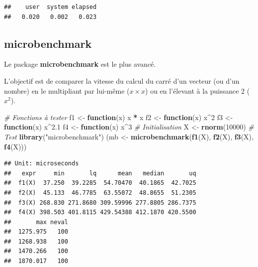 \documentclass[
  12pt,
  french,
  a4paper,
  extrafontsizes,onecolumn,openright
  ]{memoir}
\newenvironment{Shaded}{\begin{snugshade}}{\end{snugshade}}
\newcommand{\CommentTok}[1]{\textcolor[rgb]{0.56,0.35,0.01}{\textit{#1}}}
\newcommand{\ControlFlowTok}[1]{\textcolor[rgb]{0.13,0.29,0.53}{\textbf{#1}}}
\newcommand{\DecValTok}[1]{\textcolor[rgb]{0.00,0.00,0.81}{#1}}
\newcommand{\FloatTok}[1]{\textcolor[rgb]{0.00,0.00,0.81}{#1}}
\newcommand{\KeywordTok}[1]{\textcolor[rgb]{0.13,0.29,0.53}{\textbf{#1}}}
\newcommand{\NormalTok}[1]{#1}
\newcommand{\OperatorTok}[1]{\textcolor[rgb]{0.81,0.36,0.00}{\textbf{#1}}}
\newcommand{\StringTok}[1]{\textcolor[rgb]{0.31,0.60,0.02}{#1}}
\begin{document}
\begin{verbatim}
##    user  system elapsed 
##   0.020   0.002   0.023
\end{verbatim}

\normalsize

\hypertarget{microbenchmark}{%
\subsection{microbenchmark}\label{microbenchmark}}

Le package \textbf{microbenchmark} est le plus avancé.

L'objectif est de comparer la vitesse du calcul du carré d'un vecteur (ou d'un nombre) en le multipliant par lui-même (\(x \times x\)) ou en l'élevant à la puissance 2 (\(x^2\)).

\scriptsize

\begin{Shaded}
\begin{Highlighting}[]
\CommentTok{# Fonctions à tester}
\NormalTok{f1 <-}\StringTok{ }\ControlFlowTok{function}\NormalTok{(x) x }\OperatorTok{*}\StringTok{ }\NormalTok{x}
\NormalTok{f2 <-}\StringTok{ }\ControlFlowTok{function}\NormalTok{(x) x}\OperatorTok{^}\DecValTok{2}
\NormalTok{f3 <-}\StringTok{ }\ControlFlowTok{function}\NormalTok{(x) x}\OperatorTok{^}\FloatTok{2.1}
\NormalTok{f4 <-}\StringTok{ }\ControlFlowTok{function}\NormalTok{(x) x}\OperatorTok{^}\DecValTok{3}
\CommentTok{# Initialisation}
\NormalTok{X <-}\StringTok{ }\KeywordTok{rnorm}\NormalTok{(}\DecValTok{10000}\NormalTok{)}
\CommentTok{# Test}
\KeywordTok{library}\NormalTok{(}\StringTok{"microbenchmark"}\NormalTok{)}
\NormalTok{(mb <-}\StringTok{ }\KeywordTok{microbenchmark}\NormalTok{(}\KeywordTok{f1}\NormalTok{(X), }\KeywordTok{f2}\NormalTok{(X), }\KeywordTok{f3}\NormalTok{(X), }\KeywordTok{f4}\NormalTok{(X)))}
\end{Highlighting}
\end{Shaded}

\begin{verbatim}
## Unit: microseconds
##   expr     min       lq      mean   median       uq
##  f1(X)  37.250  39.2285  54.70470  40.1865  42.7025
##  f2(X)  45.133  46.7785  63.55072  48.8655  51.2305
##  f3(X) 268.830 271.8680 309.59996 277.8805 286.7375
##  f4(X) 398.503 401.8115 429.54388 412.1870 420.5500
##       max neval
##  1275.975   100
##  1268.938   100
##  1470.266   100
##  1870.017   100
\end{verbatim}

\normalsize
\end{document}
